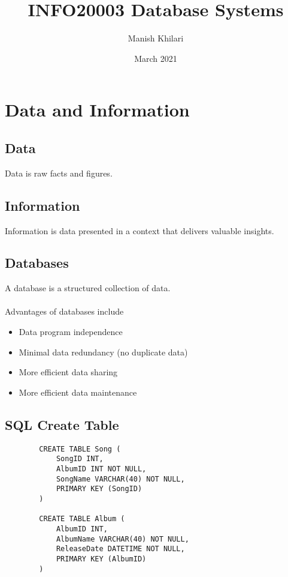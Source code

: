 \documentclass[12pt, a4paper]{article}
\title{INFO20003 Database Systems}
\author{Manish Khilari}
\date{March 2021}
\begin{document}
    
    \maketitle

    \section{Data and Information}
    \subsection{Data}
    Data is raw facts and figures. 

    \subsection{Information}
    Information is data presented in a context that delivers valuable insights. 

    \subsection{Databases}
    A database is a structured collection of data. \\\\
    Advantages of databases include 
    \begin{itemize}
        \item Data program independence 
        \item Minimal data redundancy (no duplicate data) 
        \item More efficient data sharing 
        \item More efficient data maintenance 
    \end{itemize}

    \subsection{SQL Create Table}
    \begin{verbatim}
        CREATE TABLE Song (
            SongID INT, 
            AlbumID INT NOT NULL, 
            SongName VARCHAR(40) NOT NULL, 
            PRIMARY KEY (SongID)
        )

        CREATE TABLE Album (
            AlbumID INT, 
            AlbumName VARCHAR(40) NOT NULL, 
            ReleaseDate DATETIME NOT NULL, 
            PRIMARY KEY (AlbumID)
        )
    \end{verbatim}
\end{document}
